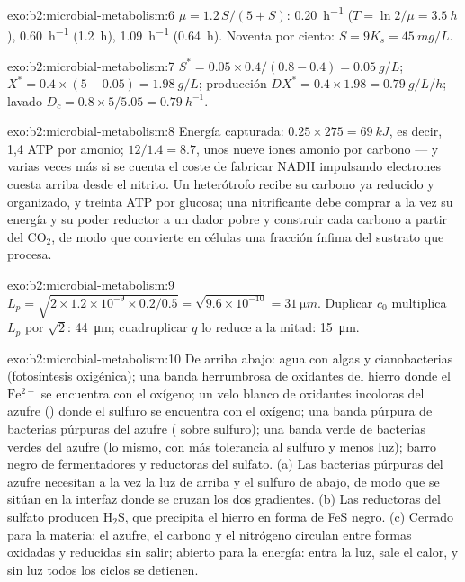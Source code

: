 \begin{solution}{exo:b2:microbial-metabolism:6}
$\mu = 1.2\,S/(5 + S)$: \qty{0.20}{h^{-1}} ($T = \ln 2/\mu =
\qty{3.5}{h}$), \qty{0.60}{h^{-1}} (\qty{1.2}{h}), \qty{1.09}{h^{-1}}
(\qty{0.64}{h}). Noventa por ciento: $S = 9K_s = \qty{45}{mg/L}$.
\end{solution}

\begin{solution}{exo:b2:microbial-metabolism:7}
$S^* = 0.05\times 0.4/(0.8 - 0.4) = \qty{0.05}{g/L}$; $X^* =
0.4\times(5 - 0.05) = \qty{1.98}{g/L}$; producción $DX^* = 0.4\times
1.98 = \qty{0.79}{g/L/h}$; lavado $D_c = 0.8\times 5/5.05 =
\qty{0.79}{h^{-1}}$.
\end{solution}

\begin{solution}{exo:b2:microbial-metabolism:8}
Energía capturada: $0.25\times 275 = \qty{69}{kJ}$, es decir, 1,4 ATP
por amonio; $12/1.4 = 8.7$, unos nueve iones amonio por carbono --- y
varias veces más si se cuenta el coste de fabricar NADH impulsando
electrones cuesta arriba desde el nitrito. Un heterótrofo recibe su
carbono ya reducido y organizado, y treinta ATP por glucosa; una
nitrificante debe comprar a la vez su energía y su poder reductor a un
dador pobre y construir cada carbono a partir del $\mathrm{CO_2}$, de
modo que convierte en células una fracción ínfima del sustrato que
procesa.
\end{solution}

\begin{solution}{exo:b2:microbial-metabolism:9}
$L_p = \sqrt{2\times 1.2\times 10^{-9}\times 0.2/0.5} =
\sqrt{9.6\times 10^{-10}} = \qty{31}{\micro m}$. Duplicar $c_0$
multiplica $L_p$ por $\sqrt 2$: \qty{44}{\micro m}; cuadruplicar $q$
lo reduce a la mitad: \qty{15}{\micro m}.
\end{solution}

\begin{solution}{exo:b2:microbial-metabolism:10}
De arriba abajo: agua con algas y cianobacterias (fotosíntesis
oxigénica); una banda herrumbrosa de oxidantes del hierro donde el
$\mathrm{Fe^{2+}}$ se encuentra con el oxígeno; un velo blanco de
oxidantes incoloras del azufre () donde el sulfuro se
encuentra con el oxígeno; una banda púrpura de bacterias púrpuras del
azufre ( sobre sulfuro); una banda verde de
bacterias verdes del azufre (lo mismo, con más tolerancia al sulfuro y
menos luz); barro negro de fermentadores y reductoras del sulfato.
(a) Las bacterias púrpuras del azufre necesitan a la vez la luz de
arriba y el sulfuro de abajo, de modo que se sitúan en la interfaz donde
se cruzan los dos gradientes. (b) Las reductoras del sulfato producen
$\mathrm{H_2S}$, que precipita el hierro en forma de FeS negro.
(c) Cerrado para la materia: el azufre, el carbono y el nitrógeno
circulan entre formas oxidadas y reducidas sin salir; abierto para la
energía: entra la luz, sale el calor, y sin luz todos los ciclos se
detienen.
\end{solution}

